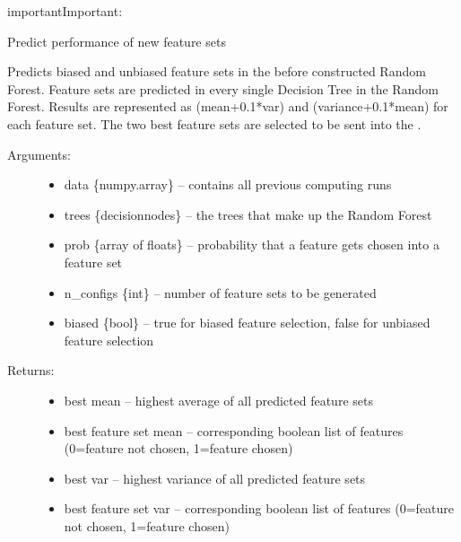 \documentclass[letterpaper,10pt,english]{sphinxmanual}
\begin{document}
\begin{sphinxadmonition}{important}{Important:}
\begin{fulllineitems}
\label{\detokenize{RF:ForestFire.Main.forest_predict}}
Predict performance of new feature sets

Predicts biased and unbiased feature sets in the before constructed Random Forest.
Feature sets are predicted in every single Decision Tree in the Random Forest.
Results are represented as (mean+0.1*var) and (variance+0.1*mean) for each feature set.
The two best feature sets are selected to be sent into the {\hyperref[\detokenize{Overview:mla}]{}}.
\begin{description}
\item[{Arguments:}] \leavevmode\begin{itemize}
\item {} 
data \{numpy.array\} -- contains all previous computing runs

\item {} 
trees \{decisionnodes\} -- the trees that make up the Random Forest

\item {} 
prob \{array of floats\} -- probability that a feature gets chosen into a feature set

\item {} 
n\_configs \{int\} -- number of feature sets to be generated

\item {} 
biased \{bool\} -- true for biased feature selection, false for unbiased feature selection

\end{itemize}

\item[{Returns:}] \leavevmode\begin{itemize}
\item {} 
best mean -- highest average of all predicted feature sets

\item {} 
best feature set mean -- corresponding boolean list of features (0=feature not chosen, 1=feature chosen)

\item {} 
best var -- highest variance of all predicted feature sets

\item {} 
best feature set var -- corresponding boolean list of features (0=feature not chosen, 1=feature chosen)


\end{itemize}
\end{description}
\end{fulllineitems}
\end{sphinxadmonition}
\end{document}

